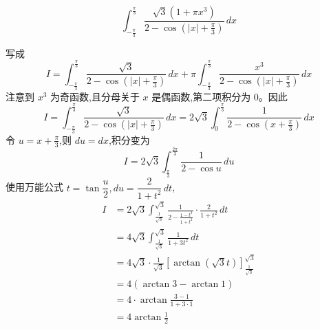 \begin{questions}
    \question
    \[
    \int_{-\frac{\pi}{3}}^{\frac{\pi}{3}} \frac{\sqrt{3}(1+\pi x^3)}{2 - \cos(|x|+\frac{\pi}{3})} \, dx
    \]
    \begin{solution}
        写成
        \[
        I = \int_{-\frac{\pi}{3}}^{\frac{\pi}{3}} \frac{\sqrt{3}}{2-\cos(|x|+\frac{\pi}{3})} \, dx + \pi \int_{-\frac{\pi}{3}}^{\frac{\pi}{3}} \frac{x^3}{2-\cos(|x|+\frac{\pi}{3})} \, dx
        \]
        注意到 $x^3$ 为奇函数,且分母关于 $x$ 是偶函数,第二项积分为 0。因此
        \[
        I = \int_{-\frac{\pi}{3}}^{\frac{\pi}{3}} \frac{\sqrt{3}}{2-\cos(|x|+\frac{\pi}{3})} \, dx 
        = 2 \sqrt{3} \int_{0}^{\frac{\pi}{3}} \frac{1}{2-\cos(x+\frac{\pi}{3})} \, dx
        \]
        令 $u = x + \frac{\pi}{3}$,则 $du = dx$,积分变为
        \[
        I = 2 \sqrt{3} \int_{\frac{\pi}{3}}^{\frac{2\pi}{3}} \frac{1}{2-\cos u} \, du
        \]
        使用万能公式 $t = \tan \dfrac{u}{2},du = \dfrac{2}{1+t^2} \, dt$,
        \begin{align*}
        I &= 2 \sqrt{3} \int_{\frac{1}{\sqrt{3}}}^{\sqrt{3}} \frac{1}{2 - \frac{1-t^2}{1+t^2}} \cdot \frac{2}{1+t^2} \, dt \\
        &= 4 \sqrt{3} \int_{\frac{1}{\sqrt{3}}}^{\sqrt{3}} \frac{1}{1 + 3 t^2} \, dt \\
        &= 4 \sqrt{3} \cdot \frac{1}{\sqrt{3}} \left[ \arctan(\sqrt{3} t) \right]_{\frac{1}{\sqrt{3}}}^{\sqrt{3}} \\
        &= 4  (\arctan 3 - \arctan 1)  \\
        &= 4 \cdot \arctan \frac{3-1}{1+3\cdot 1} \\
        &= 4 \arctan \frac{1}{2}
        \end{align*}
    \end{solution}


\end{questions}
